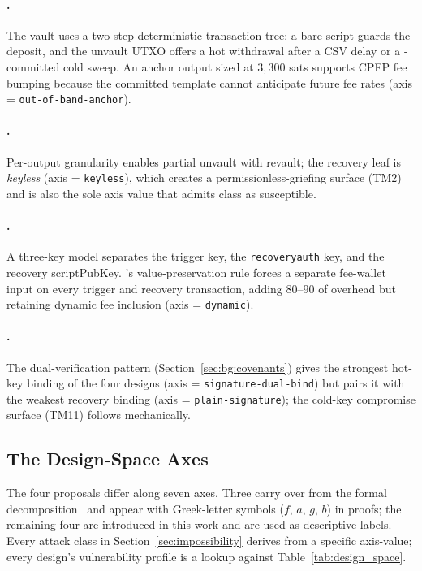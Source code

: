 \paragraph{\opctv{}.} The vault uses a two-step deterministic
transaction tree: a bare \opctv{} script guards the deposit, and the
unvault UTXO offers a hot withdrawal after a CSV delay or a
\opctv{}-committed cold sweep. An anchor output sized at $3{,}300$
sats supports CPFP fee bumping because the committed template cannot
anticipate future fee rates (axis \axfee{} =
\texttt{out-of-band-anchor}).

\paragraph{\opccv{}.} Per-output granularity enables partial unvault
with revault; the recovery leaf is \emph{keyless} (axis \axauth{} =
\texttt{keyless}), which creates a permissionless-griefing surface
(TM2) and is also the sole axis value that admits class \classgrief{}
as susceptible.

\paragraph{\opvault{}.} A three-key model separates the trigger key,
the \texttt{recoveryauth} key, and the recovery scriptPubKey.
\opvault{}'s value-preservation rule forces a separate fee-wallet
input on every trigger and recovery transaction, adding $80$--$90$\vB{}
of overhead but retaining dynamic fee inclusion (axis \axfee{} =
\texttt{dynamic}).

\paragraph{\catcsfs{}.} The dual-verification pattern (Section~\ref{sec:bg:covenants})
gives the strongest hot-key binding of the four designs (axis
\axwdbind{} = \texttt{signature-dual-bind}) but pairs it with the
weakest recovery binding (axis \axrecbind{} =
\texttt{plain-signature}); the cold-key
compromise surface (TM11) follows mechanically.

\subsection{The Design-Space Axes}
\label{sec:bg:axes}

The four proposals differ along seven axes. Three carry over from the
formal decomposition~\cite{SHMB20,Har24} and appear with Greek-letter
symbols ($f$, $a$, $g$, $b$) in proofs; the remaining four are
introduced in this work and are used as descriptive labels. Every
attack class in Section~\ref{sec:impossibility} derives from a
specific axis-value; every design's vulnerability profile is a lookup
against Table~\ref{tab:design_space}.

